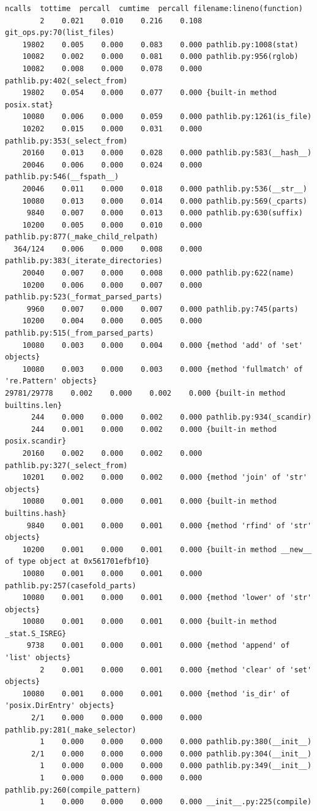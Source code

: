 \documentclass[a4paper,12pt]{article}
\begin{document}
\begin{lstlisting}[basicstyle=\ttfamily\fontsize{9}{9}\selectfont]
   ncalls  tottime  percall  cumtime  percall filename:lineno(function)
        2    0.021    0.010    0.216    0.108 git_ops.py:70(list_files)
    19802    0.005    0.000    0.083    0.000 pathlib.py:1008(stat)
    10082    0.002    0.000    0.081    0.000 pathlib.py:956(rglob)
    10082    0.008    0.000    0.078    0.000 pathlib.py:402(_select_from)
    19802    0.054    0.000    0.077    0.000 {built-in method posix.stat}
    10080    0.006    0.000    0.059    0.000 pathlib.py:1261(is_file)
    10202    0.015    0.000    0.031    0.000 pathlib.py:353(_select_from)
    20160    0.013    0.000    0.028    0.000 pathlib.py:583(__hash__)
    20046    0.006    0.000    0.024    0.000 pathlib.py:546(__fspath__)
    20046    0.011    0.000    0.018    0.000 pathlib.py:536(__str__)
    10080    0.013    0.000    0.014    0.000 pathlib.py:569(_cparts)
     9840    0.007    0.000    0.013    0.000 pathlib.py:630(suffix)
    10200    0.005    0.000    0.010    0.000 pathlib.py:877(_make_child_relpath)
  364/124    0.006    0.000    0.008    0.000 pathlib.py:383(_iterate_directories)
    20040    0.007    0.000    0.008    0.000 pathlib.py:622(name)
    10200    0.006    0.000    0.007    0.000 pathlib.py:523(_format_parsed_parts)
     9960    0.007    0.000    0.007    0.000 pathlib.py:745(parts)
    10200    0.004    0.000    0.005    0.000 pathlib.py:515(_from_parsed_parts)
    10080    0.003    0.000    0.004    0.000 {method 'add' of 'set' objects}
    10080    0.003    0.000    0.003    0.000 {method 'fullmatch' of 're.Pattern' objects}
29781/29778    0.002    0.000    0.002    0.000 {built-in method builtins.len}
      244    0.000    0.000    0.002    0.000 pathlib.py:934(_scandir)
      244    0.001    0.000    0.002    0.000 {built-in method posix.scandir}
    20160    0.002    0.000    0.002    0.000 pathlib.py:327(_select_from)
    10201    0.002    0.000    0.002    0.000 {method 'join' of 'str' objects}
    10080    0.001    0.000    0.001    0.000 {built-in method builtins.hash}
     9840    0.001    0.000    0.001    0.000 {method 'rfind' of 'str' objects}
    10200    0.001    0.000    0.001    0.000 {built-in method __new__ of type object at 0x561701efbf10}
    10080    0.001    0.000    0.001    0.000 pathlib.py:257(casefold_parts)
    10080    0.001    0.000    0.001    0.000 {method 'lower' of 'str' objects}
    10080    0.001    0.000    0.001    0.000 {built-in method _stat.S_ISREG}
     9738    0.001    0.000    0.001    0.000 {method 'append' of 'list' objects}
        2    0.001    0.000    0.001    0.000 {method 'clear' of 'set' objects}
    10080    0.001    0.000    0.001    0.000 {method 'is_dir' of 'posix.DirEntry' objects}
      2/1    0.000    0.000    0.000    0.000 pathlib.py:281(_make_selector)
        1    0.000    0.000    0.000    0.000 pathlib.py:380(__init__)
      2/1    0.000    0.000    0.000    0.000 pathlib.py:304(__init__)
        1    0.000    0.000    0.000    0.000 pathlib.py:349(__init__)
        1    0.000    0.000    0.000    0.000 pathlib.py:260(compile_pattern)
        1    0.000    0.000    0.000    0.000 __init__.py:225(compile)



\end{lstlisting}
\end{document}
